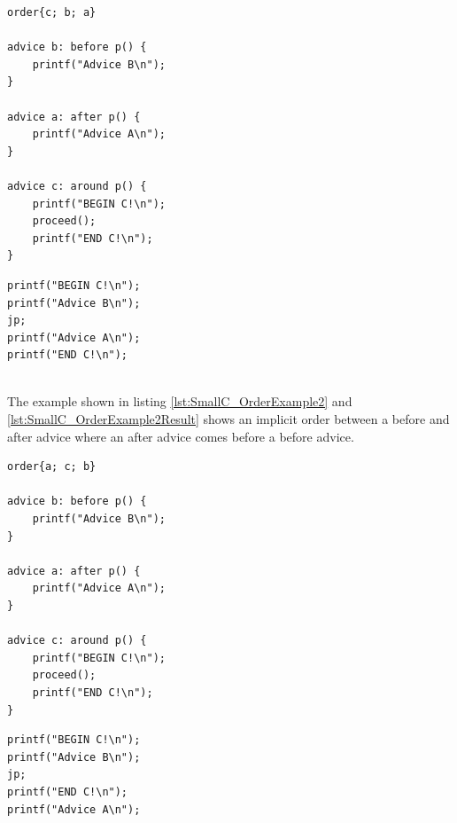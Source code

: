 \documentclass[a4paper]{report}
\begin{document}
\begin{minipage}{0.42\textwidth}
\begin{lstlisting}[caption=An example of a non-trivial order, label=lst:SmallC_OrderExample]
order{c; b; a}

advice b: before p() {
	printf("Advice B\n");
}

advice a: after p() {
	printf("Advice A\n");
}

advice c: around p() {
	printf("BEGIN C!\n");
	proceed();
	printf("END C!\n");
}
\end{lstlisting}
\end{minipage}\hfill
\begin{minipage}{0.42\textwidth}
\begin{lstlisting}[caption=The result of the order, label=lst:SmallC_OrderExampleResult]
printf("BEGIN C!\n");
printf("Advice B\n");
jp;
printf("Advice A\n");
printf("END C!\n");
\end{lstlisting}
\end{minipage}\\
The example shown in listing \ref{lst:SmallC_OrderExample2} and \ref{lst:SmallC_OrderExample2Result} shows an implicit order between a before and after advice where an after advice comes before a before advice.\\
\begin{minipage}{0.42\textwidth}
\begin{lstlisting}[caption=An example of a non-trivial order, label=lst:SmallC_OrderExample2]
order{a; c; b}

advice b: before p() {
	printf("Advice B\n");
}

advice a: after p() {
	printf("Advice A\n");
}

advice c: around p() {
	printf("BEGIN C!\n");
	proceed();
	printf("END C!\n");
}
\end{lstlisting}
\end{minipage}\hfill
\begin{minipage}{0.42\textwidth}
\begin{lstlisting}[caption=The result of the order, label=lst:SmallC_OrderExample2Result]
printf("BEGIN C!\n");
printf("Advice B\n");
jp;
printf("END C!\n");
printf("Advice A\n");
\end{lstlisting}
\end{minipage}
\end{document}
